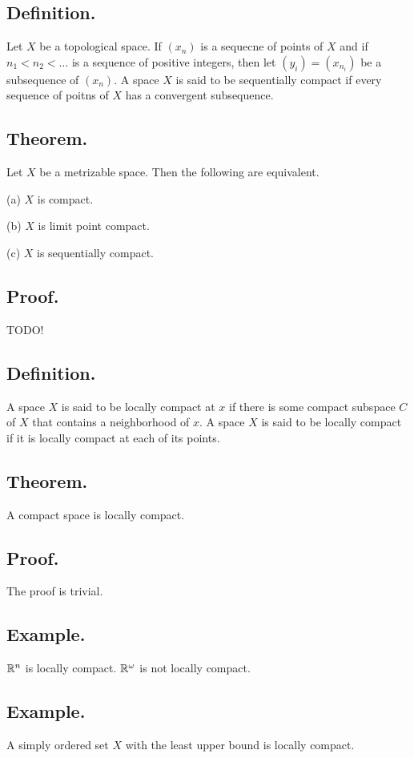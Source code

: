 \documentclass[titlepage]{article}
\begin{document}
\subsection{Definition.} Let $X$ be a topological space. If $(x_{n})$ is a sequecne of points of $X$ and if $n_{1} < n_{2} < \ldots$ is a sequence of positive integers, then let $(y_{i}) = (x_{n_{i}})$ be a subsequence of $(x_{n})$. A space $X$ is said to be sequentially compact if every sequence of poitns of $X$ has a convergent subsequence.

\subsection{Theorem.} Let $X$ be a metrizable space. Then the following are equivalent.

(a) $X$ is compact.

(b) $X$ is limit point compact.

(c) $X$ is sequentially compact.

\subsection{Proof.} TODO!

\subsection{Definition.} A space $X$ is said to be locally compact at $x$ if there is some compact subspace $C$ of $X$ that contains a neighborhood of $x$. A space $X$ is said to be locally compact if it is locally compact at each of its points.

\subsection{Theorem.} A compact space is locally compact.

\subsection{Proof.} The proof is trivial.

\subsection{Example.} $\mathbb{R}^{n}$ is locally compact. $\mathbb{R}^{\omega}$ is not locally compact.

\subsection{Example.} A simply ordered set $X$ with the least upper bound is locally compact.
\end{document}
